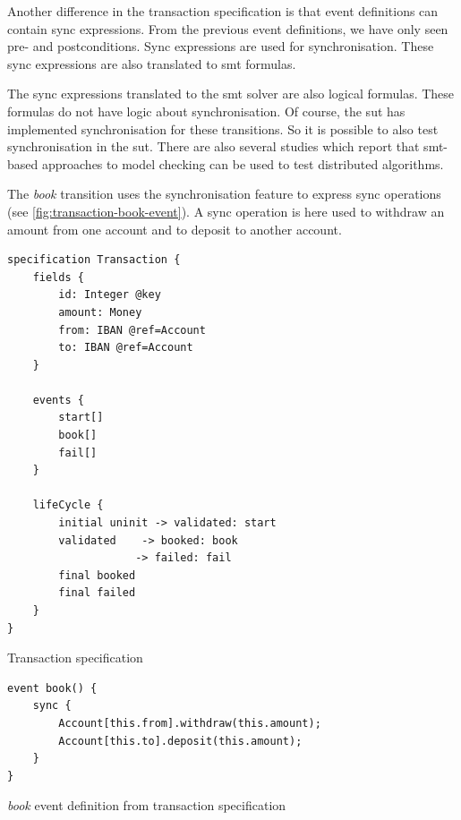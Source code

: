 Another difference in the transaction specification is that event definitions
can contain sync expressions. From the previous event definitions, we have only
seen pre- and postconditions. Sync expressions are used for synchronisation.
These sync expressions are also translated to \gls{smt} formulas.

The sync expressions translated to the \gls{smt} solver are also logical formulas.
These formulas do not have logic about synchronisation. Of course, the \gls{sut} has
implemented synchronisation for these transitions. So it is possible to also
test synchronisation in the \gls{sut}. There are also several studies which report
that \gls{smt}-based approaches to model checking can be used to test distributed
algorithms.~\cite{konnov2015you, alberti2015smt, mccaffrey2016verification}


The \textit{book} transition uses the synchronisation feature to express sync
operations (see \autoref{fig:transaction-book-event}). A sync operation is here
used to withdraw an amount from one account and to deposit to another account.


\begin{sourcecode}[h!]
\begin{lstlisting}[]
specification Transaction {
	fields {
		id: Integer @key
		amount: Money
		from: IBAN @ref=Account
		to: IBAN @ref=Account
	}

	events {
		start[]
		book[]
		fail[]
	}

	lifeCycle {
		initial uninit -> validated: start
		validated    -> booked: book
					-> failed: fail
		final booked
		final failed
	}
}
\end{lstlisting}
\caption{Transaction specification}\label{fig:transaction-spec}
\end{sourcecode}
\FloatBarrier

\begin{sourcecode}[h!]
\begin{lstlisting}[]
event book() {
	sync {
		Account[this.from].withdraw(this.amount);
		Account[this.to].deposit(this.amount);
	}
}
\end{lstlisting}
\caption{\textit{book} event definition from transaction specification}\label{fig:transaction-book-event}
\end{sourcecode}
\FloatBarrier

